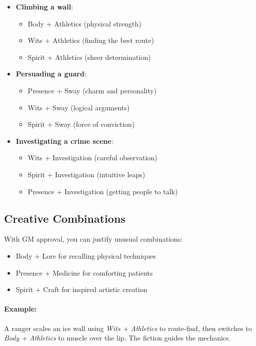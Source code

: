 \begin{itemize}
\item \textbf{Climbing a wall}:
  \begin{itemize}
  \item Body + Athletics (physical strength)
  \item Wits + Athletics (finding the best route)
  \item Spirit + Athletics (sheer determination)
  \end{itemize}

\item \textbf{Persuading a guard}:
  \begin{itemize}
  \item Presence + Sway (charm and personality)
  \item Wits + Sway (logical arguments)
  \item Spirit + Sway (force of conviction)
  \end{itemize}

\item \textbf{Investigating a crime scene}:
  \begin{itemize}
  \item Wits + Investigation (careful observation)
  \item Spirit + Investigation (intuitive leaps)
  \item Presence + Investigation (getting people to talk)
  \end{itemize}
\end{itemize}

\subsection*{Creative Combinations}
With GM approval, you can justify unusual combinations:
\begin{itemize}
\item Body + Lore for recalling physical techniques
\item Presence + Medicine for comforting patients
\item Spirit + Craft for inspired artistic creation
\end{itemize}

\paragraph{Example:}
A ranger scales an ice wall using \emph{Wits + Athletics} to route-find, then switches to \emph{Body + Athletics} to muscle over the lip. The fiction guides the mechanics.

